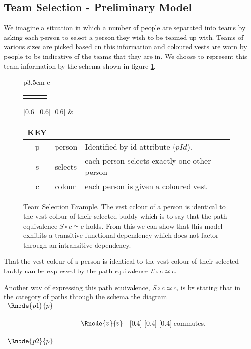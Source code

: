 \subsection{Team Selection - Preliminary Model}

We imagine a situation in which a number of people are separated into teams by asking each person to select a person they wish to be teamed up with. Teams of various sizes are picked based on this information and coloured vests are worn by people to be indicative of the teams that they are in.
We choose to represent this team information by the schema shown in figure \ref{teamselectionpreliminaryERschema}. 

\begin{figure} [h]
\begin{center}
\begin{tabular}{p{3.5cm} c}
\begin{tabular}{c p{1.5cm} c}
   \Rnode{p}{p} & & \Rnode{v}{v}
\end{tabular}
[0.6]
[0.6]
[0.6]
\idcomp
& \footnotesize
\begin{tabular}{c p{1.5cm} p{4cm}}
KEY && \\
\hline
p & person & Identified by id attribute ($pId$). \\
s & selects & each person selects exactly one other person \\
c & colour & each person is given a coloured vest 
\end{tabular} 
\end{tabular}
\end{center}
\caption{Team Selection Example. The  vest colour  of a person is 
identical to the vest colour of their selected buddy which is to say that the path equivalence $S \circ c \simeq c$ holds. From this
we can show that this model exhibits a transitive functional dependency which does not factor through an intransitive dependency.
}
\label{teamselectionpreliminaryERschema}
\end{figure}

That the  vest colour  of a person is 
identical to the vest colour of their selected buddy can be expressed by the path equivalence $S \circ c \simeq c$. 
\begin{categoricalaside}
Another way of expressing this 
path equivalence, $S \circ c \simeq c$, is by stating that in the category of paths through the schema  the diagram
$
\begin{array}{c p{0.75cm} c}
   \Rnode{p1}{p}  & &                  \\[0.5cm]
	                 & &    \Rnode{v}{v} \\[0.5cm]
   \Rnode{p2}{p}  & &
			
\end{array}
$
[0.4]
[0.4]
[0.4]
commutes. 
\end{categoricalaside}


